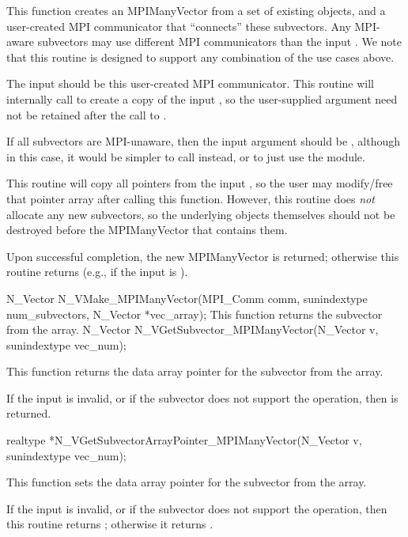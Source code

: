 {
  This function creates an MPIManyVector from a set of existing {\nvector}
  objects, and a user-created MPI communicator that ``connects'' these
  subvectors.  Any MPI-aware subvectors may use different MPI
  communicators than the input .  We note that this routine
  is designed to support any combination of the use cases above.

  The input  should be this user-created MPI communicator.
  This routine will internally call  to create a
  copy of the input , so the user-supplied  argument
  need not be retained after the call to .

  If all subvectors are MPI-unaware, then the input  argument
  should be , although in this case, it would be
  simpler to call  instead, or to just use
  the {\nvecmanyvector} module.

  This routine will copy all  pointers from the input
  , so the user may modify/free that pointer array
  after calling this function.  However, this routine does \emph{not}
  allocate any new subvectors, so the underlying {\nvector} objects
  themselves should not be destroyed before the MPIManyVector that
  contains them.

  Upon successful completion, the new MPIManyVector is returned;
  otherwise this routine returns  (e.g., if the input
   is ).
}
{
  N\_Vector N\_VMake\_MPIManyVector(MPI\_Comm comm,
  sunindextype num\_subvectors,
  N\_Vector *vec\_array);
}
{
  This function returns the  subvector from the {\nvector}
  array.
}
{
  N\_Vector N\_VGetSubvector\_MPIManyVector(N\_Vector v, sunindextype vec\_num);
}
{
  This function returns the data array pointer for the 
  subvector from the {\nvector} array.

  If the input  is invalid, or if the subvector does not
  support the  operation, then  is returned.
}
{
  realtype *N\_VGetSubvectorArrayPointer\_MPIManyVector(N\_Vector v, sunindextype vec\_num);
}
{
  This function sets the data array pointer for the 
  subvector from the {\nvector} array.

  If the input  is invalid, or if the subvector does not
  support the  operation, then this routine
  returns ; otherwise it returns .
}
